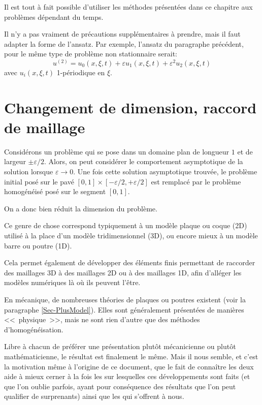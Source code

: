 Il est tout à fait possible d'utiliser les méthodes présentées dans ce chapitre
aux problèmes dépendant du temps.

Il n'y a pas vraiment de précautions supplémentaires à prendre, mais il faut adapter
la forme de l'ansatz.
Par exemple, l'ansatz du paragraphe précédent, pour le même type de problème
non stationnaire serait:
\begin{equation}u^{(2)} = u_0(x,\xi,t)+\varepsilon u_1(x,\xi,t) + \varepsilon^2 u_2(x,\xi,t)\end{equation}
avec $u_i(x,\xi,t)$ 1-périodique en $\xi$.





\medskip
\section{Changement de dimension, raccord de maillage}

\medskip
Considérons un problème qui se pose dans un domaine plan de longueur $1$ et de largeur $\pm\varepsilon/2$.
Alors, on peut considérer le comportement asymptotique de la solution lorsque $\varepsilon \longrightarrow 0$.
Une fois cette solution asymptotique trouvée, le problème initial posé sur le pavé
$[0,1]\times[-\varepsilon/2,+\varepsilon/2]$ est remplacé par le problème homogénéisé
posé sur le segment $[0,1]$.

On a donc bien réduit la dimension du problème.

\medskip
Ce genre de chose correspond typiquement à un modèle plaque ou coque (2D) utilisé à la place
d'un modèle tridimensionnel (3D), ou encore mieux à un modèle barre ou poutre (1D).

Cela permet également de développer des éléments finis permettant de raccorder
des maillages 3D à des maillages 2D ou à des maillages 1D, afin d'alléger les modèles numériques
là où ils peuvent l'être.

\medskip
En mécanique, de nombreuses théories de plaques ou poutres existent (voir la paragraphe \ref{Sec-PlusModel}).
Elles sont généralement présentées de manières <<~physique~>>, mais ne sont rien d'autre que des
méthodes d'homogénéisation.

Libre à chacun de préférer une présentation plutôt mécanicienne ou plutôt mathématicienne,
le résultat est finalement le même. Mais il nous semble, et c'est la motivation même à l'origine de
ce document, que le fait de connaître les deux aide à mieux cerner à la fois les 
sur lesquelles ces développements sont faits (et que l'on oublie parfois, ayant pour conséquence
des résultats que l'on peut qualifier de surprenants) ainsi que les  qui s'offrent
à nous. 